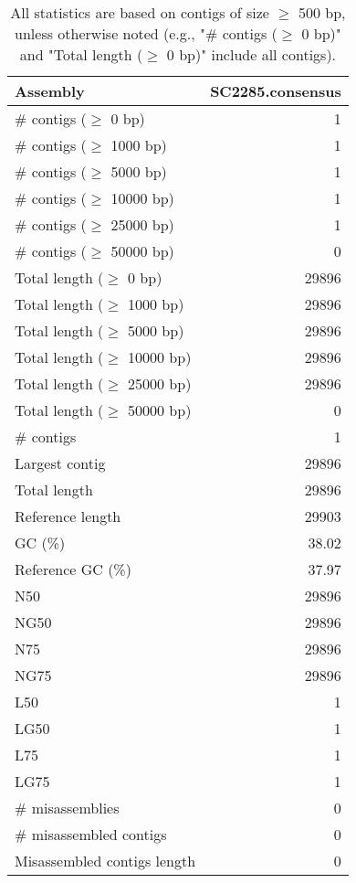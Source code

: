 \documentclass[12pt,a4paper]{article}
\begin{document}
\begin{table}[ht]
\begin{center}
\caption{All statistics are based on contigs of size $\geq$ 500 bp, unless otherwise noted (e.g., "\# contigs ($\geq$ 0 bp)" and "Total length ($\geq$ 0 bp)" include all contigs).}
\begin{tabular}{|l*{1}{|r}|}
\hline
Assembly & SC2285.consensus \\ \hline
\# contigs ($\geq$ 0 bp) & 1 \\ \hline
\# contigs ($\geq$ 1000 bp) & 1 \\ \hline
\# contigs ($\geq$ 5000 bp) & 1 \\ \hline
\# contigs ($\geq$ 10000 bp) & 1 \\ \hline
\# contigs ($\geq$ 25000 bp) & 1 \\ \hline
\# contigs ($\geq$ 50000 bp) & 0 \\ \hline
Total length ($\geq$ 0 bp) & 29896 \\ \hline
Total length ($\geq$ 1000 bp) & 29896 \\ \hline
Total length ($\geq$ 5000 bp) & 29896 \\ \hline
Total length ($\geq$ 10000 bp) & 29896 \\ \hline
Total length ($\geq$ 25000 bp) & 29896 \\ \hline
Total length ($\geq$ 50000 bp) & 0 \\ \hline
\# contigs & 1 \\ \hline
Largest contig & 29896 \\ \hline
Total length & 29896 \\ \hline
Reference length & 29903 \\ \hline
GC (\%) & 38.02 \\ \hline
Reference GC (\%) & 37.97 \\ \hline
N50 & 29896 \\ \hline
NG50 & 29896 \\ \hline
N75 & 29896 \\ \hline
NG75 & 29896 \\ \hline
L50 & 1 \\ \hline
LG50 & 1 \\ \hline
L75 & 1 \\ \hline
LG75 & 1 \\ \hline
\# misassemblies & 0 \\ \hline
\# misassembled contigs & 0 \\ \hline
Misassembled contigs length & 0 \\ \hline

\end{tabular}
\end{center}
\end{table}
\end{document}
